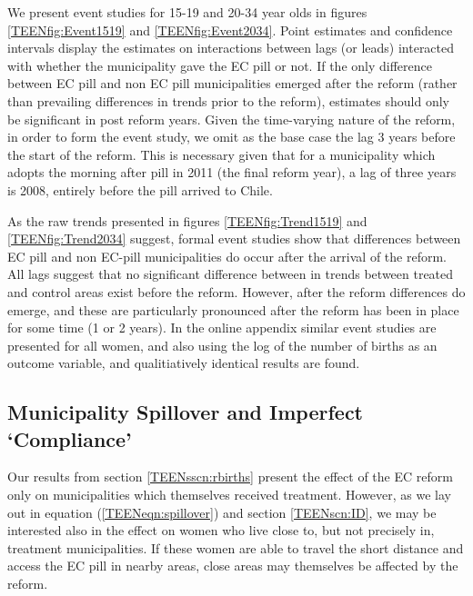 We present event studies for 15-19 and 20-34 year olds in figures 
\ref{TEENfig:Event1519} and \ref{TEENfig:Event2034}.  Point estimates and 
confidence intervals display the estimates on interactions between lags (or 
leads) interacted with whether the municipality gave the EC pill or not.  If the
only difference between EC pill and non EC pill municipalities emerged after the
reform (rather than prevailing differences in trends prior to the reform), 
estimates should only be significant in post reform years. Given the time-varying
nature of the reform, in order to form the event study, we omit as the base case
the lag 3 years before the start of the reform.  This is necessary given that for
a municipality which adopts the morning after pill in 2011 (the final reform 
year), a lag of three years is 2008, entirely before the pill arrived to Chile.

As the raw trends presented in figures \ref{TEENfig:Trend1519} and 
\ref{TEENfig:Trend2034} suggest, formal event studies show that differences 
between EC pill and non EC-pill municipalities do occur after the arrival of the
reform.  All lags suggest that no significant difference between in trends
between treated and control areas exist before the reform.  However, after the
reform differences do emerge, and these are particularly pronounced after the
reform has been in place for some time (1 or 2 years).  In the online appendix
similar event studies are presented for all women, and also using the log of the
number of births as an outcome variable, and qualitiatively identical results are
found.

\subsection{Municipality Spillover and Imperfect `Compliance'}
\label{TEENsscn:spillover}
Our results from section \ref{TEENsscn:rbirths} present the effect of the EC
reform only on municipalities which themselves received treatment.  However,
as we lay out in equation (\ref{TEENeqn:spillover}) and section \ref{TEENscn:ID},
we may be interested also in the effect on women who live close to, but not
precisely in, treatment municipalities.  If these women are able to travel the
short distance and access the EC pill in nearby areas, close areas may themselves
be affected by the reform.  

